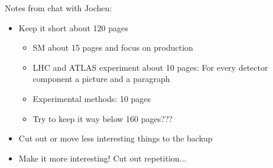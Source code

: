 Notes from chat with Jochen:
\begin{itemize}

\item Keep it short \ra about 120 pages
  \begin{itemize}
  \item SM about 15 pages and focus on \HH production

  \item LHC and ATLAS experiment about 10 pages: For every detector
    component a picture and a paragraph

  \item Experimental methods: 10 pages

  \item Try to keep it way below 160 pages???
  \end{itemize}

\item Cut out or move less interesting things to the backup

\item Make it more interesting! Cut out repetition...

\end{itemize}


